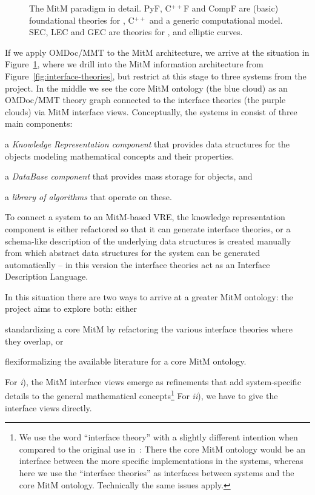 \begin{figure}[ht]\centering
  
  \caption{The MitM paradigm in detail. PyF, C${}^{++}$F and CompF are (basic) foundational theories for \Python, C${}^{++}$ and a generic computational model. SEC, LEC and GEC are theories for \Sage, \LMFDB and \GAP elliptic curves.}\label{fig:mitm}
\end{figure}
If we apply OMDoc/MMT to the MitM architecture, we arrive at the situation in
Figure~\ref{fig:mitm}, where we drill into the MitM information architecture from
Figure~\ref{fig:interface-theories}, but restrict at this stage to three systems from the \ODK
project. In the middle we see the core MitM ontology (the blue cloud) as an OMDoc/MMT
theory graph connected to the interface theories (the purple clouds) via MitM
interface views. Conceptually, the systems in \ODK consist of three main components:
\begin{compactenum}[\em i\rm)]
\item a \emph{Knowledge Representation component} that provides data structures for the objects modeling mathematical concepts and their properties.
\item a \emph{DataBase component} that provides mass storage for objects, and 
\item a \emph{library of algorithms} that operate on these.
\end{compactenum}
To connect a system to an MitM-based VRE, the knowledge representation component is either
refactored so that it can generate interface theories, or a schema-like description of the
underlying data structures is created manually from which abstract data structures for the
system can be generated automatically -- in this version the interface theories act as an
Interface Description Language.

In this situation there are two ways to arrive at a greater MitM ontology: the \ODK
project aims to explore both: either
\begin{inparaenum}[\em i\rm)] 
\item standardizing a core MitM by refactoring the various interface theories where they
  overlap, or
\item flexiformalizing the available literature for a core MitM ontology.
\end{inparaenum}
For \emph{i}), the MitM interface views emerge as refinements that add system-specific details
to the general mathematical concepts\footnote{We use the word ``interface theory'' with a
  slightly different intention when compared to the original use
  in~\cite{KohRabSac:fvip11}: There the core MitM ontology would be an interface between
  the more specific implementations in the systems, whereas here we use the ``interface
  theories'' as interfaces between systems and the core MitM ontology. Technically the
  same issues apply.} For \emph{ii}), we have to give the interface views directly. 

